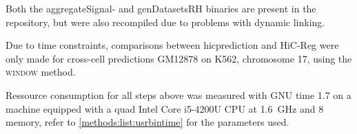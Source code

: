 Both the aggregateSignal- and genDatasetsRH binaries are present in the repository, 
but were also recompiled due to problems with dynamic linking. 

Due to time constraints, comparisons between hicprediction and HiC-Reg 
were only made for cross-cell predictions GM12878 on K562, chromosome 17,
using the \textsc{window} method.

Ressource consumption for all steps above 
was measured with GNU time 1.7 on a machine equipped with a quad Intel{\small\textregistered} Core{\small\texttrademark} i5-4200U CPU at 
\SI{1.6}{\giga\hertz} and \SI{8}{\giga\byte} memory, refer to \autoref{methods:list:usrbintime} for the parameters used.




